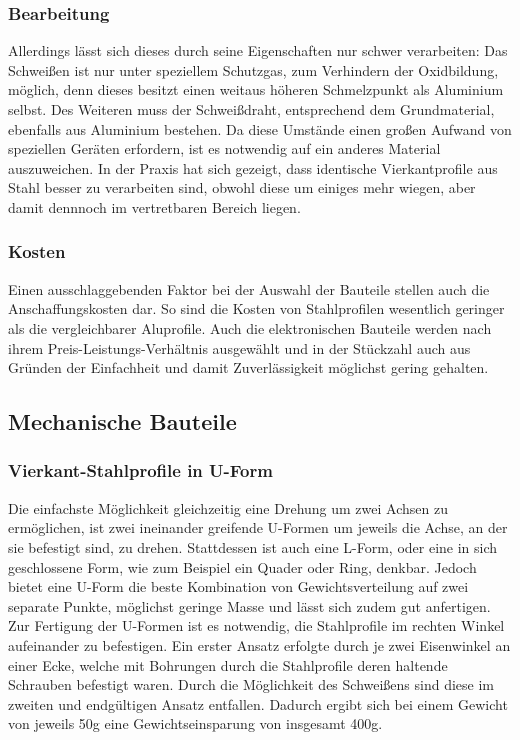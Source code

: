 \documentclass[a4paper, 12pt, bibtotocnumbered, liststotocnumbered]{scrartcl}
\begin{document}
	\subsubsection{Bearbeitung}
	Allerdings lässt sich dieses durch seine Eigenschaften nur schwer verarbeiten: Das Schweißen ist nur unter speziellem Schutzgas, zum Verhindern der Oxidbildung, möglich, denn dieses besitzt einen weitaus höheren Schmelzpunkt als Aluminium selbst. Des Weiteren muss der Schweißdraht, entsprechend dem Grundmaterial, ebenfalls aus Aluminium bestehen. Da diese Umstände einen großen Aufwand von speziellen Geräten erfordern, ist es notwendig auf ein anderes Material auszuweichen. In der Praxis hat sich gezeigt, dass identische Vierkantprofile aus Stahl besser zu verarbeiten sind, obwohl diese um einiges mehr wiegen, aber damit dennnoch im vertretbaren Bereich liegen.

	\subsubsection{Kosten}
	Einen ausschlaggebenden Faktor bei der Auswahl der Bauteile stellen auch die Anschaffungskosten dar. So sind die Kosten von Stahlprofilen wesentlich geringer als die vergleichbarer Aluprofile. Auch die elektronischen Bauteile werden nach ihrem Preis-Leistungs-Verhältnis ausgewählt und in der Stückzahl auch aus Gründen der Einfachheit und damit Zuverlässigkeit möglichst gering gehalten.

	\subsection{Mechanische Bauteile}
	\subsubsection{Vierkant-Stahlprofile in U-Form}
	Die einfachste Möglichkeit gleichzeitig eine Drehung um zwei Achsen zu ermöglichen, ist zwei ineinander greifende U-Formen um jeweils die Achse, an der sie befestigt sind, zu drehen. Stattdessen ist auch eine L-Form, oder eine in sich geschlossene Form, wie zum Beispiel ein Quader oder Ring, denkbar. Jedoch bietet eine U-Form die beste Kombination von Gewichtsverteilung auf zwei separate Punkte, möglichst geringe Masse und lässt sich zudem gut anfertigen.
	Zur Fertigung der U-Formen ist es notwendig, die Stahlprofile im rechten Winkel aufeinander zu befestigen. Ein erster Ansatz erfolgte durch je zwei Eisenwinkel an einer Ecke, welche mit Bohrungen durch die Stahlprofile deren haltende Schrauben befestigt waren. Durch die Möglichkeit des Schweißens sind diese im zweiten und endgültigen Ansatz entfallen. Dadurch ergibt sich bei einem Gewicht von jeweils 50g eine Gewichtseinsparung von insgesamt 400g.
\end{document}
